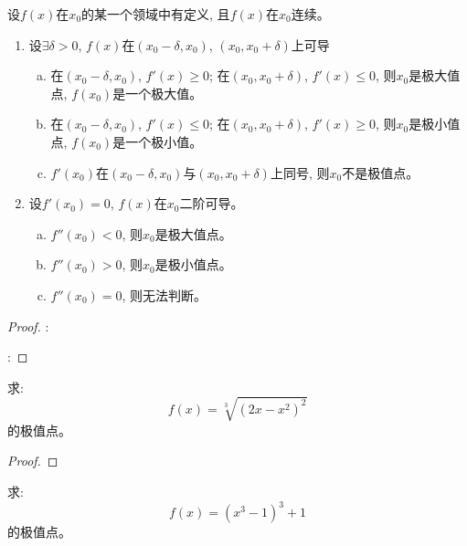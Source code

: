 \begin{theorem}[极值点的判定定理]
    设$f(x)$在$x_0$的某一个领域中有定义, 且$f(x)$在$x_0$连续。
    \begin{enumerate}
        \item 设$\exists \delta > 0$, $f(x)$在$(x_0-\delta, x_0)$, $(x_0, x_0+\delta)$上可导
        \begin{enumerate}[(a)]
            \item 在$(x_0-\delta, x_0)$, $f'(x) \ge 0$; 在$(x_0, x_0+\delta)$, $f'(x) \le 0$, 则$x_0$是极大值点, $f(x_0)$是一个极大值。
            \item 在$(x_0-\delta, x_0)$, $f'(x) \le 0$; 在$(x_0, x_0+\delta)$, $f'(x) \ge 0$, 则$x_0$是极小值点, $f(x_0)$是一个极小值。
            \item $f'(x_0)$在$(x_0-\delta, x_0)$与$(x_0, x_0+\delta)$上同号, 则$x_0$不是极值点。
        \end{enumerate}
        \item 设$f'(x_0) = 0$, $f(x)$在$x_0$二阶可导。
        \begin{enumerate}[(a)]
            \item $f''(x_0) < 0$, 则$x_0$是极大值点。
            \item $f''(x_0) > 0$, 则$x_0$是极小值点。
            \item $f''(x_0) = 0$, 则无法判断。
        \end{enumerate}
    \end{enumerate}
\end{theorem}
\begin{proof}
    :

    :
\end{proof}
\begin{remark}
    
\end{remark}

\begin{example}
    求:
    \begin{equation*}
        f(x) = \sqrt[3]{(2x-x^2)^2}
    \end{equation*}
    的极值点。
\end{example}
\begin{proof}
    
\end{proof}

\begin{example}
    求:
    \begin{equation*}
        f(x) = (x^3-1)^3+1
    \end{equation*}
    的极值点。
\end{example}
\begin{solution}
    
\end{solution}

